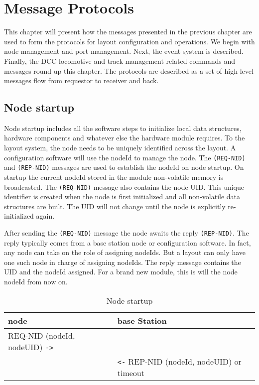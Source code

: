 \chapter{Message Protocols}

This chapter will present how the messages presented in the previous chapter are used to form the protocols for layout configuration and operations. We begin with node management and port management. Next, the event system is described. Finally, the DCC locomotive and track management related commands and messages round up this chapter. The protocols are described as a set of high level messages flow from requestor to receiver and back.

\section{Node startup}

Node startup includes all the software steps to initialize local data structures, hardware components and whatever else the hardware module requires. To the layout system, the node needs to be uniquely identified across the layout. A configuration software will use the nodeId to manage the node. The \texttt{(REQ-NID)} and \texttt{(REP-NID)} messages are used to establish the nodeId on node startup. On startup the current nodeId stored in the module non-volatile memory is broadcasted. The \texttt{(REQ-NID)} message also contains the node UID. This unique identifier is created when the node is first initialized and all non-volatile data structures are built. The UID will not change until the node is explicitly re-initialized again.

After sending the \texttt{(REQ-NID)} message the node awaits the reply \texttt{(REP-NID)}. The reply typically comes from a base station node or configuration software. In fact, any node can take on the role of assigning nodeIds. But a layout can only have one such node in charge of assigning nodeIds. The reply message contains the UID and the nodeId assigned. For a brand new module, this is will the node nodeId from now on.

\begin{table}[ht!]
    \centering
    \caption{Node startup}
    \begin{tabular}{|p{}|p{}|}
        \toprule
        \textbf{node} & \textbf{base Station} \\
        \midrule
        REQ-NID (nodeId, nodeUID) \texttt{->} & \\
        & \texttt{<-} REP-NID (nodeId, nodeUID) or timeout \\
        \bottomrule
    \end{tabular}
\end{table}

